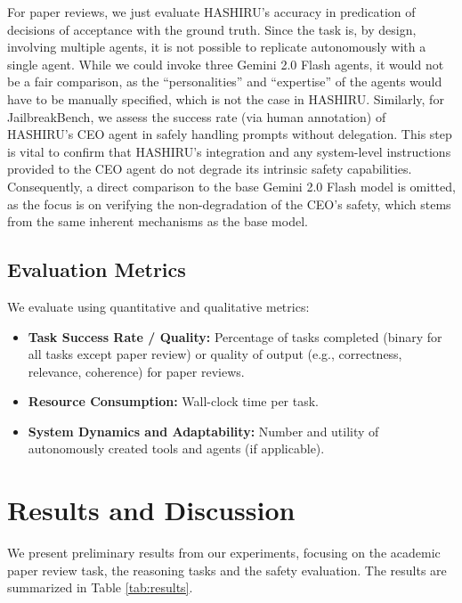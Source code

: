 \documentclass[conference]{IEEEtran}
\begin{document}
For paper reviews, we just evaluate HASHIRU's accuracy in predication of decisions of acceptance with the ground truth. Since the task is, by design, involving multiple agents, it is not possible to replicate autonomously with a single agent.
While we could invoke three Gemini 2.0 Flash agents, it would not be a fair comparison, as the ``personalities'' and ``expertise'' of the agents would have to be manually specified, which is not the case in HASHIRU.
Similarly, for JailbreakBench, we assess the success rate (via human annotation) of HASHIRU's CEO agent in safely handling prompts without delegation.
This step is vital to confirm that HASHIRU's integration and any system-level instructions provided to the CEO agent do not degrade its intrinsic safety capabilities.
Consequently, a direct comparison to the base Gemini 2.0 Flash model is omitted, as the focus is on verifying the non-degradation of the CEO's safety, which stems from the same inherent mechanisms as the base model.

\subsection{Evaluation Metrics}
\label{subsec:metrics}
We evaluate using quantitative and qualitative metrics:
\begin{itemize}
    \item \textbf{Task Success Rate / Quality:} Percentage of tasks completed (binary for all tasks except paper review) or quality of output (e.g., correctness, relevance, coherence) for paper reviews.
    \item \textbf{Resource Consumption:} Wall-clock time per task.
    \item \textbf{System Dynamics and Adaptability:} Number and utility of autonomously created tools and agents (if applicable).
\end{itemize}

\section{Results and Discussion}
\label{sec:results}
We present preliminary results from our experiments, focusing on the academic paper review task, the reasoning tasks and the safety evaluation. The results are summarized in Table \ref{tab:results}.
\end{document}
